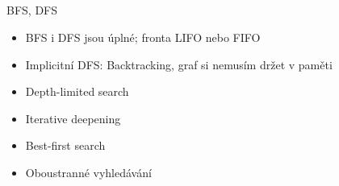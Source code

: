 \documentclass{beamer}
\begin{document}
\subsection{}

\subsection{}
\begin{frame}{BFS, DFS}
\begin{itemize}
\item BFS i DFS jsou úplné; fronta LIFO nebo FIFO
\item Implicitní DFS: Backtracking, graf si nemusím držet v paměti
\item Depth-limited search
\item Iterative deepening
\item Best-first search
\item Oboustranné vyhledávání
\end{itemize}
\end{frame}
\end{document}
